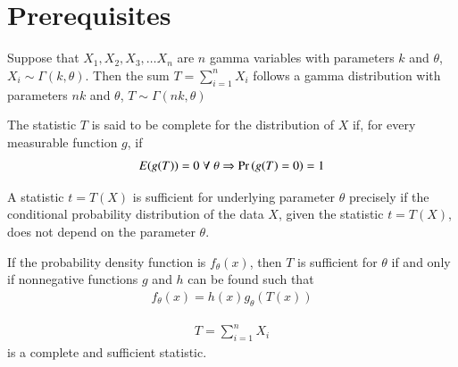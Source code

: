 \documentclass[journal,12pt,twocolumn]{IEEEtran}
\begin{document}
\section{Prerequisites}
\begin{lemma}
Suppose that $X_1, X_2, X_3, \ldots X_n$ are $n$ gamma variables with parameters $k$ and $\theta$, $X_i \sim \Gamma(k, \theta)$. Then the sum $T = \sum_{i=1}^{n} X_i$ follows a gamma distribution with parameters $nk$ and $\theta$, $T \sim \Gamma(nk, \theta)$
\end{lemma}
\begin{definition}
The statistic $T$ is said to be complete for the distribution of $X$ if, for every measurable function $g$, if
\begin{align}
E(g(T)) = 0 \; \forall \; \theta \Rightarrow \Pr\left(g(T)=0\right) = 1 
\end{align}
\end{definition}
\begin{definition}
A statistic $t = T(X)$ is sufficient for underlying parameter $\theta$ precisely if the conditional probability distribution of the data $X$, given the statistic $t = T(X)$, does not depend on the parameter $\theta$. 
\end{definition}
\begin{theorem}
If the probability density function is $f_\theta (x)$, then $T$ is sufficient for $\theta$ if and only if nonnegative functions $g$ and $h$ can be found such that
\begin{align}
f_\theta (x) = h(x)g_\theta(T(x))
\end{align}
\end{theorem}
\begin{lemma} \label{lemma_sufficient_complete}
\begin{align}
T = \sum_{i=1}^{n} X_i
\end{align}
is a complete and sufficient statistic. 
\end{lemma}
\end{document}
